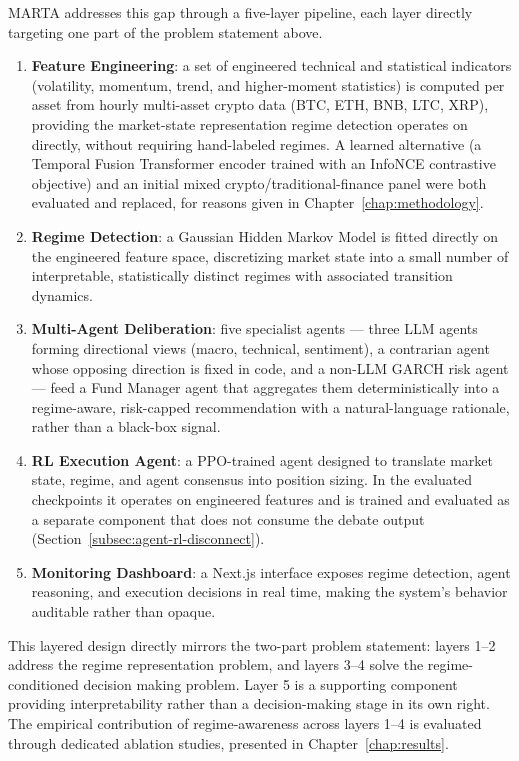 MARTA addresses this gap through a five-layer pipeline, each layer directly targeting one part of the problem statement above.

\begin{enumerate}
    \item \textbf{Feature Engineering}: a set of engineered technical and statistical indicators (volatility, momentum, trend, and higher-moment statistics) is computed per asset from hourly multi-asset crypto data (BTC, ETH, BNB, LTC, XRP), providing the market-state representation regime detection operates on directly, without requiring hand-labeled regimes. A learned alternative (a Temporal Fusion Transformer encoder trained with an InfoNCE contrastive objective) and an initial mixed crypto/traditional-finance panel were both evaluated and replaced, for reasons given in Chapter~\ref{chap:methodology}.
    \item \textbf{Regime Detection}: a Gaussian Hidden Markov Model is fitted directly on the engineered feature space, discretizing market state into a small number of interpretable, statistically distinct regimes with associated transition dynamics.
    \item \textbf{Multi-Agent Deliberation}: five specialist agents --- three LLM agents forming directional views (macro, technical, sentiment), a contrarian agent whose opposing direction is fixed in code, and a non-LLM GARCH risk agent --- feed a Fund Manager agent that aggregates them deterministically into a regime-aware, risk-capped recommendation with a natural-language rationale, rather than a black-box signal.
    \item \textbf{RL Execution Agent}: a PPO-trained agent designed to translate market state, regime, and agent consensus into position sizing. In the evaluated checkpoints it operates on engineered features and is trained and evaluated as a separate component that does not consume the debate output (Section~\ref{subsec:agent-rl-disconnect}).
    \item \textbf{Monitoring Dashboard}: a Next.js interface exposes regime detection, agent reasoning, and execution decisions in real time, making the system's behavior auditable rather than opaque.
\end{enumerate}

This layered design directly mirrors the two-part problem statement: layers 1--2 address the regime representation problem, and layers 3--4 solve the regime-conditioned decision making problem. Layer 5 is a supporting component providing interpretability rather than a decision-making stage in its own right. The empirical contribution of regime-awareness across layers 1--4 is evaluated through dedicated ablation studies, presented in Chapter~\ref{chap:results}.

